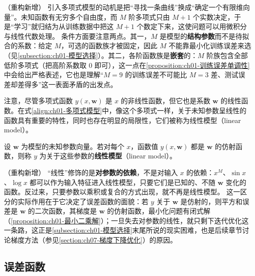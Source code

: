 \documentclass[../../main.tex]{subfiles}
\begin{document}
\begin{remark}（重构新增）
引入多项式模型的动机是把“寻找一条曲线”换成“确定一个有限维向量”。未知函数有无穷多个自由度，而 $M$ 阶多项式只由 $M+1$ 个实数决定，于是“学习”就归结为从训练数据中把这 $M+1$ 个数定下来，这使问题可以用微积分与线性代数处理。
条件方面要注意两点。其一，$M$ 是模型的\textbf{结构参数}而不是待拟合的系数：给定 $M$，可选的函数族才被固定，因此 $M$ 不能靠最小化训练误差来选（见\cref{subsection:ch01-模型选择}）。其二，各阶函数族是\textbf{嵌套}的：$M$ 阶族包含全部低阶多项式（把高阶系数取 $0$ 即可），这一点在\cref{proposition:ch01-训练误差单调性}中会给出严格表述，它也是理解“$M=9$ 的训练误差不可能比 $M=3$ 差、测试误差却差得多”这一表面矛盾的出发点。
\end{remark}

注意，尽管多项式函数 $y(x,\mathbf{w})$ 是 $x$ 的非线性函数，但它也是系数 $\mathbf{w}$ 的线性函数。在式\eqref{align:ch01-多项式模型}中，像这个多项式一样，关于未知参数呈线性的函数具有重要的特性，同时也存在明显的局限性，它们被称为线性模型（linear model）。

\begin{definition}[线性模型]\label{definition:ch01-线性模型}
设 $\mathbf{w}$ 为模型的未知参数向量。若对每个 $x$，函数值 $y(x,\mathbf{w})$ 都是 $\mathbf{w}$ 的仿射函数，则称 $y$ 为关于这些参数的\textbf{线性模型}（linear model）。
\end{definition}

\begin{remark}（重构新增）
“线性”修饰的是\textbf{对参数的依赖}，不是对输入 $x$ 的依赖：$x^M$、$\sin x$、$\log x$ 都可以作为输入特征进入线性模型，只要它们是已知的、不随 $\mathbf{w}$ 变化的函数。反过来，只要参数以乘积或复合的方式出现，就不再是线性模型。
这一区分的实际作用在于它决定了误差函数的面貌：若 $y$ 关于 $\mathbf{w}$ 是仿射的，则平方和误差是 $\mathbf{w}$ 的二次函数，其梯度是 $\mathbf{w}$ 的仿射函数，最小化问题有闭式解（\cref{proposition:ch01-最小二乘解}）；一旦失去对参数的线性，就只剩下迭代优化这一条路，这正是\cref{subsection:ch01-模型选择}末尾所说的现实困难，也是后续章节讨论梯度方法（参见\cref{section:ch07-梯度下降优化}）的原因。
\end{remark}

\subsection{误差函数}\label{subsection:ch01-误差函数}
\end{document}
